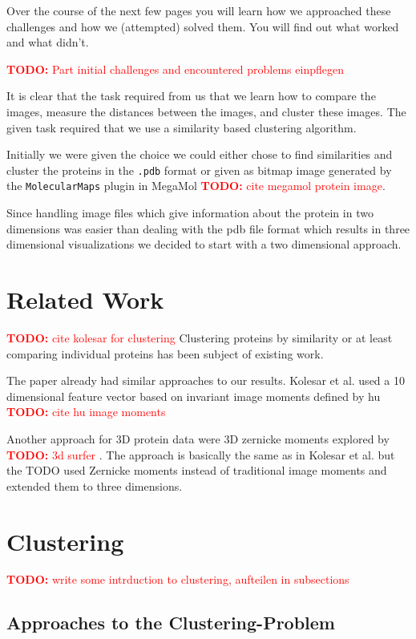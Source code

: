 \documentclass[journal]{vgtc}       %
\newcommand{\todo}[1]{\textcolor{red}{\textbf{TODO:} #1}}
\begin{document}
Over the course of the next few pages you will learn how we approached these challenges and how we (attempted) solved them. You will find out what  worked and what didn't.

\todo{Part initial challenges and encountered problems einpflegen}

It is clear that the task required from us that we learn how to compare the images, measure the distances between the images, and cluster these images.
The given task required that we use a similarity based clustering algorithm.

Initially we were given the choice we could either chose to find similarities and cluster the proteins in the \verb|.pdb| format or given as bitmap image generated by the \verb|MolecularMaps| plugin in MegaMol \todo{cite megamol protein image}\cite{molecularmaps}.

Since handling image files which give information about the protein in two dimensions was easier than dealing with the pdb file format which results in three dimensional visualizations we decided to start with a two dimensional approach.


\section{Related Work}\label{sec:relatedWork}

\todo{cite kolesar for clustering}
Clustering proteins by similarity or at least comparing individual proteins has been subject of existing work.

The paper \cite{kolesar} already had similar approaches to our results. Kolesar et al. used a 10 dimensional feature vector based on invariant image moments defined by hu \todo{cite hu image moments} \cite{humoments}

Another approach for 3D protein data were 3D zernicke moments explored by \todo{3d surfer } \cite{3dsurfer}. The approach is basically the same as in Kolesar et al. but the TODO used Zernicke moments instead of traditional image moments and extended them to three dimensions.


\section{Clustering}
\todo{write some intrduction to clustering, aufteilen in subsections}
\subsection{Approaches to the Clustering-Problem}
\end{document}
